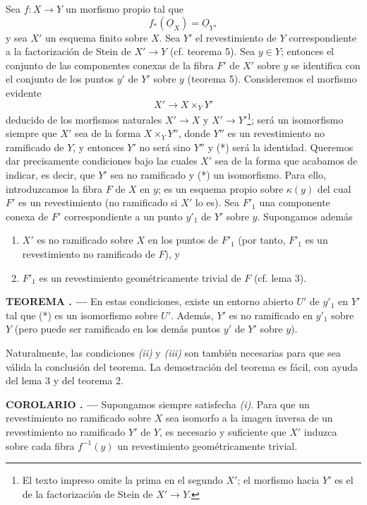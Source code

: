\documentclass[11pt,twoside,openany]{book}
\numberwithin{equation}{section}
\newcommand{\src}[1]{%
  \phantomsection\hypertarget{src:#1}{}%
  \marginpar{\raggedleft\footnotesize\sffamily #1}%
}
\newcommand{\Osh}{\underline{O}}
\theoremstyle{plain}
\theoremstyle{definition}
\theoremstyle{remark}
\newcommand{\result}[2]{%
  \par\medskip\noindent\textbf{#1%
  \if\relax\detokenize{#2}\relax\else\space#2\fi. ---}\enspace
}
\newcommand{\FgaUnitKey}{frontmatter}
\renewcommand{\src}[1]{%
  \phantomsection\hypertarget{src:\FgaUnitKey:#1}{}%
  \marginpar{\raggedleft\footnotesize\sffamily #1}%
}
\theoremstyle{plain}
\theoremstyle{definition}
\theoremstyle{remark}
\begin{document}
Sea $f:X\longrightarrow Y$ un morfismo propio tal que
\begin{equation}
  \tag{i}
  f_*(\Osh_X)=\Osh_Y,
\end{equation}
y sea $X'$ un esquema finito sobre $X$. Sea $Y'$ el revestimiento de $Y$
correspondiente a la factorización de Stein de $X'\longrightarrow Y$
(cf. teorema 5). Sea $y\in Y$; entonces el conjunto de las componentes conexas
de la fibra $F'$ de $X'$ sobre $y$ se identifica con el conjunto de los puntos
$y'$ de $Y'$ sobre $y$ (teorema 5). Consideremos el morfismo evidente
\begin{equation}
  \tag{*}
  X'\longrightarrow X\times_Y Y'
\end{equation}
deducido de los morfismos naturales $X'\longrightarrow X$ y
$X'\longrightarrow Y'$\footnote{El texto impreso omite la prima en el segundo
$X'$; el morfismo hacia $Y'$ es el de la factorización de Stein de
$X'\to Y$.}; será un isomorfismo siempre que $X'$ sea de la forma
$X\times_Y Y''$, donde $Y''$ es un revestimiento no ramificado de $Y$, y
entonces $Y'$ no será sino $Y''$ y (*) será la identidad. Queremos dar
precisamente condiciones bajo las cuales $X'$ sea de la forma que acabamos de
indicar, es decir, que $Y'$ sea no ramificado y (*) un isomorfismo. Para ello,
introduzcamos la fibra $F$ de $X$ en $y$; es un esquema propio sobre
$\kappa(y)$ del cual $F'$ es un revestimiento (no ramificado si $X'$ lo es).
Sea $F'_1$ una componente conexa de $F'$ correspondiente a un punto $y'_1$ de
$Y'$ sobre $y$. Supongamos además
\begin{enumerate}
  \item[\textit{(ii)}] $X'$ es no ramificado sobre $X$ en los puntos de $F'_1$
    (por tanto, $F'_1$ es un revestimiento no ramificado de $F$), y
  \item[\textit{(iii)}] $F'_1$ es un revestimiento geométricamente trivial de
    $F$ (cf. lema 3).
\end{enumerate}

\result{TEOREMA}{11} En estas condiciones, existe un entorno abierto $U'$ de
$y'_1$ en $Y'$ tal que (*) es un isomorfismo sobre $U'$. Además, $Y'$ es no
ramificado en $y'_1$ sobre $Y$ (pero puede ser ramificado en los demás puntos
$y'$ de $Y'$ sobre $y$).

Naturalmente, las condiciones \textit{(ii)} y \textit{(iii)} son también
necesarias para que sea válida la conclusión del teorema. La demostración del
teorema es fácil, con ayuda del lema 3 y del teorema 2.

\src{214}
\result{COROLARIO}{1} Supongamos siempre satisfecha \textit{(i)}. Para que un
revestimiento no ramificado sobre $X$ sea isomorfo a la imagen inversa de un
revestimiento no ramificado $Y'$ de $Y$, es necesario y suficiente que $X'$
induzca sobre cada fibra $f^{-1}(y)$ un revestimiento geométricamente trivial.
\end{document}
